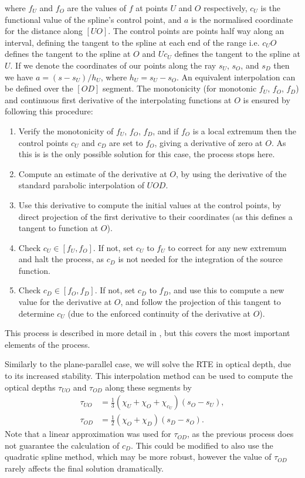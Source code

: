 where $f_U$ and $f_O$ are the values of $f$ at points $U$ and $O$ respectively, $c_U$ is the functional value of the spline's control point, and $a$ is the normalised coordinate for the distance along $[UO]$.
The control points are points half way along an interval, defining the tangent to the spline at each end of the range i.e. $c_U O$ defines the tangent to the spline at $O$ and $U c_U$ defines the tangent to the spline at $U$.
If we denote the coordinates of our points along the ray $s_U$, $s_O$, and $s_D$ then we have $a = (s - s_U) / h_U$, where $h_U = s_U - s_O$.
An equivalent interpolation can be defined over the $[OD]$ segment.
The monotonicity (for monotonic $f_U$, $f_O$, $f_D$) and continuous first derivative of the interpolating functions at $O$ is ensured by following this procedure:
\begin{enumerate}
    \item Verify the monotonicity of $f_U$, $f_O$, $f_D$, and if $f_O$ is a local extremum then the control points $c_U$ and $c_D$ are set to $f_O$, giving a derivative of zero at $O$. As this is is the only possible solution for this case, the process stops here.

    \item Compute an estimate of the derivative at $O$, by using the derivative of the standard parabolic interpolation of $UOD$.

    \item Use this derivative to compute the initial values at the control points, by direct projection of the first derivative to their coordinates (as this defines a tangent to function at $O$).

    \item Check $c_U \in [f_U, f_O]$. If not, set $c_U$ to $f_U$ to correct for any new extremum and halt the process, as $c_D$ is not needed for the integration of the source function.

    \item Check $c_D \in [f_O, f_D]$. If not, set $c_D$ to $f_D$, and use this to compute a new value for the derivative at $O$, and follow the projection of this tangent to determine $c_U$ (due to the enforced continuity of the derivative at $O$).
\end{enumerate}
This process is described in more detail in \citet{Stepan2013}, but this covers the most important elements of the process.

Similarly to the plane-parallel case, we will solve the RTE in optical depth, due to its increased stability.
This interpolation method can be used to compute the optical depths $\tau_{UO}$ and $\tau_{OD}$ along these segments by
\begin{align}
    \tau_{UO} &= \frac{1}{3}(\chi_U + \chi_O + \chi_{c_U}) (s_O - s_U),\\
    \tau_{OD} &= \frac{1}{2}(\chi_O + \chi_D) (s_D - s_O).
\end{align}
Note that a linear approximation was used for $\tau_{OD}$, as the previous process does not guarantee the calculation of $c_D$.
This could be modified to also use the quadratic spline method, which may be more robust, however the value of $\tau_{OD}$ rarely affects the final solution dramatically.

